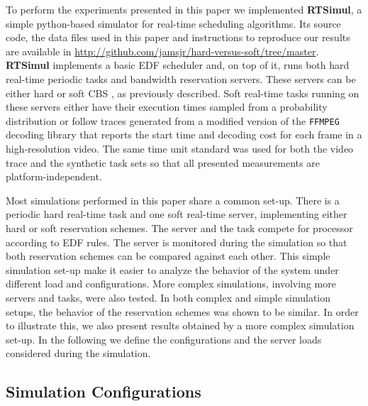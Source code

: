 \documentclass[12pt]{article}
\newcommand{\simul}{\textbf{RTSimul}} %
\begin{document}
To perform the experiments presented in this paper we implemented
\simul{}, a simple python-based simulator for real-time scheduling
algorithms. Its source code, the data files used in this paper and
instructions to reproduce our results are available in
\url{http://github.com/jamsjr/hard-versus-soft/tree/master}. \simul{}
implements a basic EDF scheduler and, on top of it, runs both hard
real-time periodic tasks and bandwidth reservation servers. These
servers can be either hard \cite{buttazzo05:soft} or soft CBS
\cite{abeni.ea98:integrating}, as previously described. Soft real-time
tasks running on these servers either have their execution times
sampled from a probability distribution or follow traces generated
from a modified version of the \texttt{FFMPEG} decoding library that
reports the start time and decoding cost for each frame in a
high-resolution video. The same time unit standard was used for both
the video trace and the synthetic task sets so that all presented
measurements are platform-independent.

Most simulations performed in this paper share a common set-up. There
is a periodic hard real-time task and one soft real-time server,
implementing either hard or soft reservation schemes. The server and
the task compete for processor according to EDF rules. The server is
monitored during the simulation so that both reservation schemes can
be compared against each other. This simple simulation set-up make it
easier to analyze the behavior of the system under different load and
configurations. More complex simulations, involving more servers and
tasks, were also tested. In both complex and simple simulation setups,
the behavior of the reservation schemes was shown to be similar. In
order to illustrate this, we also present results obtained by a more
complex simulation set-up.  In the following we define the
configurations and the server loads considered during the simulation.

\subsection{Simulation Configurations}
\label{sec:configurations}
\end{document}
